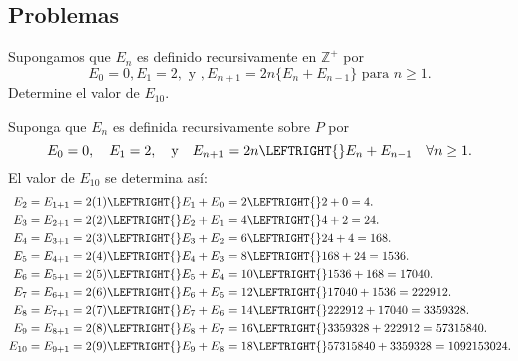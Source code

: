 \subsection{Problemas}

\begin{exercise}
Supongamos que $E_n$ es definido recursivamente en $\mathds{Z}^+$ por \[ E_0=0,E_1=2,\text{ y },E_{n+1}=2n\{E_n+E_{n-1}\} \text{ para }n\geq 1. \] Determine el valor de $E_{10}$.
\end{exercise}

\begin{solution}
	Suponga que $E_{n}$ es definida recursivamente sobre $P$ por \[ E_{0}=0,\quad E_{1}=2,\quad\text{y}\quad E_{n+1}=2n \LEFTRIGHT\{\}{E_{n}+E_{n-1}}\quad\forall n\geq1. \]
	El valor de $E_{10}$ se determina así:
	\begin{align*}
	E_{2}&=E_{1+1}=2(1)\LEFTRIGHT\{\}{E_{1}+E_{0}}=2\LEFTRIGHT\{\}{2+0}=4.\\
	E_{3}&=E_{2+1}=2(2)\LEFTRIGHT\{\}{E_{2}+E_{1}}=4\LEFTRIGHT\{\}{4+2}=24.\\
	E_{4}&=E_{3+1}=2(3)\LEFTRIGHT\{\}{E_{3}+E_{2}}=6\LEFTRIGHT\{\}{24+4}=168.\\
	E_{5}&=E_{4+1}=2(4)\LEFTRIGHT\{\}{E_{4}+E_{3}}=8\LEFTRIGHT\{\}{168+24}=1536.\\
	E_{6}&=E_{5+1}=2(5)\LEFTRIGHT\{\}{E_{5}+E_{4}}=10\LEFTRIGHT\{\}{1536+168}=17040.\\
	E_{7}&=E_{6+1}=2(6)\LEFTRIGHT\{\}{E_{6}+E_{5}}=12\LEFTRIGHT\{\}{17040+1536}=222912.\\
	E_{8}&=E_{7+1}=2(7)\LEFTRIGHT\{\}{E_{7}+E_{6}}=14\LEFTRIGHT\{\}{222912+17040}=3359328.\\
	E_{9}&=E_{8+1}=2(8)\LEFTRIGHT\{\}{E_{8}+E_{7}}=16\LEFTRIGHT\{\}{3359328+222912}=57315840.\\
	E_{10}&=E_{9+1}=2(9)\LEFTRIGHT\{\}{E_{9}+E_{8}}=18\LEFTRIGHT\{\}{57315840+3359328}=1092153024.
	\end{align*}
\end{solution}

